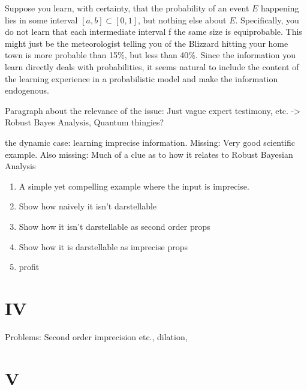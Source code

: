 \documentclass[11pt, a4paper]{scrartcl}
\begin{document}
Suppose you learn, with certainty, that the probability of an event $E$ happening lies in some interval $[a,b] \subset [0,1]$, but nothing else about $E$. Specifically, you do not learn that each intermediate interval f the same size is equiprobable. This might just be the meteorologist telling you of the Blizzard hitting your home town is more probable than 15\%, but less than 40\%. Since the information you learn directly deals with probabilities, it seems natural to include the content of the learning experience in a probabilistic model and make the information endogenous.  

\begin{figure}[h]
\centering
{}
\end{figure}

Paragraph about the relevance of the issue: Just vague expert testimony, etc. -> Robust Bayes Analysis, Quantum thingies? 

the dynamic case: learning imprecise information. Missing: Very good scientific example. Also missing: Much of a clue as to how it relates to Robust Bayesian Analysis
\begin{enumerate}[label=\roman{*}]
    \item A simple yet compelling example where the input is imprecise.
    \item Show how naively it isn't darstellable
    \item Show how it isn't darstellable as second order props
    \item Show how it is darstellable as imprecise props 
    \item profit
\end{enumerate}
\section{IV}

Problems: Second order imprecision etc., dilation, 
\section{V}

\begin{singlespacing}
\printbibliography{}
\end{singlespacing}
\end{document}
